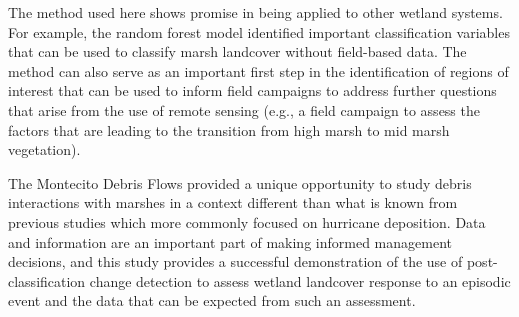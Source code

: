 \documentclass[
]{article}
\begin{document}
The method used here shows promise in being applied to other wetland
systems. For example, the random forest model identified important
classification variables that can be used to classify marsh landcover
without field-based data. The method can also serve as an important
first step in the identification of regions of interest that can be used
to inform field campaigns to address further questions that arise from
the use of remote sensing (e.g., a field campaign to assess the factors
that are leading to the transition from high marsh to mid marsh
vegetation).

The Montecito Debris Flows provided a unique opportunity to study debris
interactions with marshes in a context different than what is known from
previous studies which more commonly focused on hurricane deposition.
Data and information are an important part of making informed management
decisions, and this study provides a successful demonstration of the use
of post-classification change detection to assess wetland landcover
response to an episodic event and the data that can be expected from
such an assessment.
\end{document}
